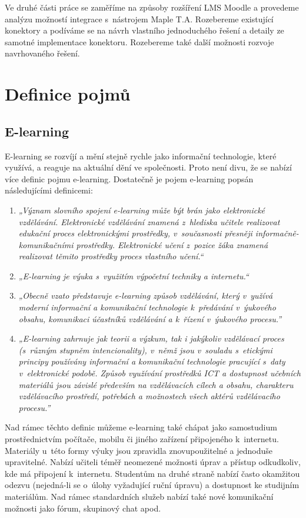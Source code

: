 \documentclass[
print,
  11pt,
  table,   
  nolof,    
  nolot,
  oneside,final
]{fithesis3}
\begin{document}
Ve druhé části práce se zaměříme na způsoby rozšíření LMS Moodle a provedeme analýzu možností integrace s~nástrojem Maple T.A. Rozebereme existující konektory a podíváme se na návrh vlastního jednoduchého řešení a detaily ze samotné implementace konektoru. Rozebereme také další možnosti rozvoje navrhovaného řešení.


\chapter{Definice pojmů}
	\section{E-learning}
E-learning se rozvíjí a mění stejně rychle jako informační technologie, které využívá, a reaguje na aktuální dění ve společnosti. Proto není divu, že se nabízí více definic pojmu e-learning. Dostatečně je pojem e-learning popsán následujícími definicemi:

\begin{enumerate}
  \item \emph{„Význam slovního spojení e-learning může být brán jako elektronic\-ké vzdělávání. Elektronické vzdělávání znamená z~hlediska učitele realizovat edukační proces elektronickými prostředky, v~současnosti přesněji informačně-komunikačními prostředky. Elektronické učení z~pozice žáka znamená realizovat těmito prostředky proces vlastního učení.“} \cite{ockajova}
  \item \emph{„E-learning je výuka s~využitím výpočetní techniky a internetu.“} \cite{korviny}
  \item \emph{„Obecně vzato představuje e-learning způsob vzdělávání, který v~yužívá moderní informační a komunikační technologie k~předávání v~ýukového obsahu, komunikaci účastníků vzdělávání a k~řízení v~ýukového procesu.” }\cite{cznic}
  \item \emph{„E-learning zahrnuje jak teorii a výzkum, tak i jakýkoliv vzdělávací proces (s~různým stupněm intencionality), v~němž jsou v~souladu s~etickými principy používány informační a komunikační technologie pracující s~daty v~elektronické podobě. Způsob využívání prostředků ICT a dostupnost učebních materiálů jsou závislé především na vzdělávacích cílech a obsahu, charakteru vzdělávacího prostředí, potřebách a možnostech všech aktérů vzdělávacího procesu.” }\cite{zounek}

\end{enumerate}


Nad rámec těchto definic můžeme e-learning také chápat jako samostudium prostřednictvím počítače, mobilu či jiného zařízení připojeného k~internetu. Materiály u~této formy výuky jsou zpravidla znovupoužitelné a jednoduše upravitelné. Nabízí učiteli téměř neomezené možnosti úprav a přístup odkudkoliv, kde má připojení k~internetu. Studentům na druhé straně nabízí často okamžitou odezvu (nejedná-li se o~úlohy vyžadující ruční úpra\-vu) a dostupnost ke studijním materiálům. Nad rámec standardních služeb nabízí také nové komunikační možnosti jako fórum, skupinový chat apod.
\end{document}
